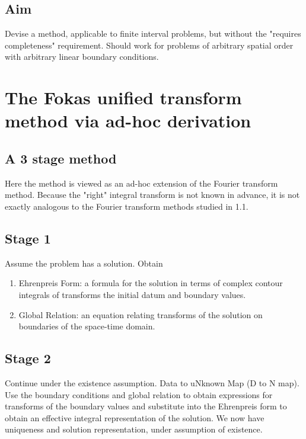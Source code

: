 \subsection*{Aim}
Devise a method, applicable to finite interval problems, but without the "requires completeness" requirement. Should work for problems of arbitrary spatial order with arbitrary linear boundary conditions.

\section{The Fokas unified transform method via ad-hoc derivation}

\subsection{A 3 stage method}
Here the method is viewed as an ad-hoc extension of the Fourier transform method. Because the "right" integral transform is not known in advance, it is not exactly analogous to the Fourier transform methods studied in 1.1.

\subsection*{Stage 1} Assume the problem has a solution. Obtain
\begin{enumerate}
	\item Ehrenpreis Form: a formula for the solution in terms of complex contour integrals of transforms the initial datum and boundary values.
	\item Global Relation: an equation relating transforms of the solution on boundaries of the space-time domain.
\end{enumerate}

\subsection*{Stage 2}
Continue under the existence assumption. Data to uNknown Map (D to N map). Use the boundary conditions and global relation to obtain expressions for transforms of the boundary values and substitute into the Ehrenpreis form to obtain an effective integral representation of the solution. We now have uniqueness and solution representation, under assumption of existence. 